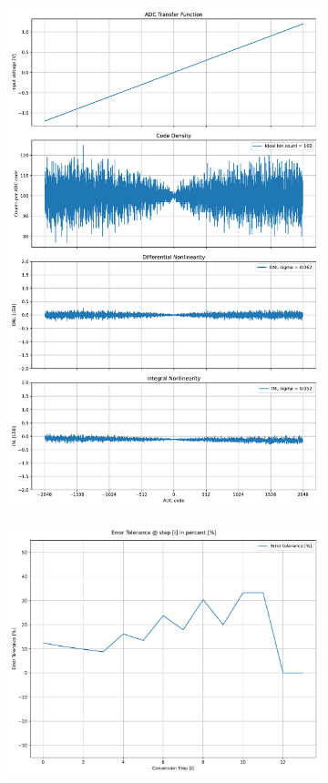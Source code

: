 \documentclass[varwidth]{standalone}
\begin{document}
\begin{figure}
\begin{subfigure}{0.32\textwidth}
    \includegraphics[width=\textwidth]{base_nonlinearity.pdf}
\end{subfigure}
\begin{subfigure}{0.32\textwidth}
    \includegraphics[width=\textwidth]{base_redundancy.pdf}

\end{subfigure}
\end{figure}
\end{document}
